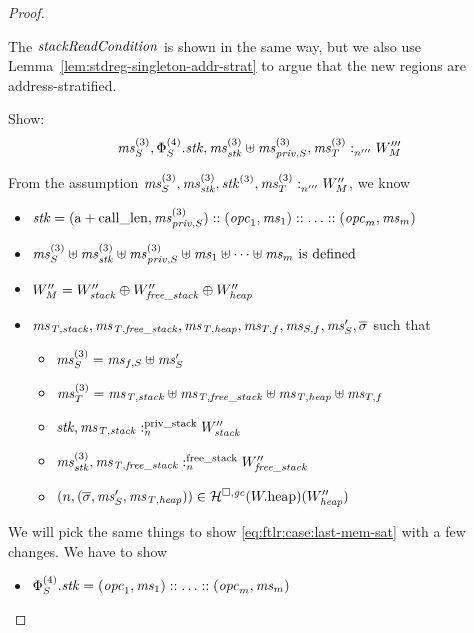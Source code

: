\begin{proof}
\begin{description}
\begin{itemize}
\begin{itemize}
\begin{itemize}
          The $\var{stackReadCondition}$ is shown in the same way, but we also use Lemma~\ref{lem:stdreg-singleton-addr-strat} to argue that the new regions are address-stratified.
        \end{itemize}

        Show:
        \begin{equation}
          \memSat[n''']{\ms^{(3)}_S,\Phi_S^{(4)}.\stk,\ms_\stk^{(3)} \uplus \ms_{\priv,S}^{(3)} ,\ms^{(3)}_T}{W'''_M}\label{eq:ftlr:case:last-mem-sat}
        \end{equation}

        From the assumption $\memSat[n''']{\ms^{(3)}_S,\ms^{(3)}_\stk, \stk^{(3)}, \ms^{(3)}_T}{W_M''}$, we know
        \begin{itemize}
        \item $\stk = (\addr + \calllen,\ms_{\priv,S}^{(3)})::(\opc_1,\ms_1):: \dots :: (\opc_m,\ms_m)$
        \item $\ms^{(3)}_S \uplus \ms^{(3)}_\stk \uplus \ms_{\priv,S}^{(3)} \uplus \ms_1 \uplus \dots \uplus \ms_m  \text{ is defined}$
        \item $W''_M = W_{\var{stack}}'' \oplus W_{\var{free\_stack}}'' \oplus W_{\var{heap}}''$
        \item $\ms_\var{T,stack}, \ms_\var{T,free\_stack}, \ms_\var{T,heap}, \ms_{T,f}, \ms_{S,f}, \ms_S',\overline{\sigma}$ such that
          \begin{itemize}
          \item $\ms^{(3)}_S = \ms_{f,S} \uplus \ms_S'$
          \item $\ms^{(3)}_T = \ms_\var{T,stack} \uplus \ms_\var{T,free\_stack} \uplus \ms_\var{T,heap} \uplus \ms_{T,f}$
          \item $\memSatStack{\stk,\ms_\var{T,stack}}{W_{\var{stack}}''}$
          \item $\memSatFStack{\ms^{(3)}_\stk,\ms_\var{T,free\_stack}}{W_{\var{free\_stack}}''}$
          \item $\npair{(\overline{\sigma},\ms_S',\ms_\var{T,heap})} \in \lrheap(\pwheap)(W_{\var{heap}}'')$
          \end{itemize}
        \end{itemize}
        We will pick the same things to show \ref{eq:ftlr:case:last-mem-sat} with a few changes.
        We have to show
        \begin{itemize}
        \item $\Phi_S^{(4)}.\stk = (\opc_1,\ms_1):: \dots :: (\opc_m,\ms_m)$


\end{itemize}
\end{itemize}
\end{itemize}
\end{description}
\end{proof}
